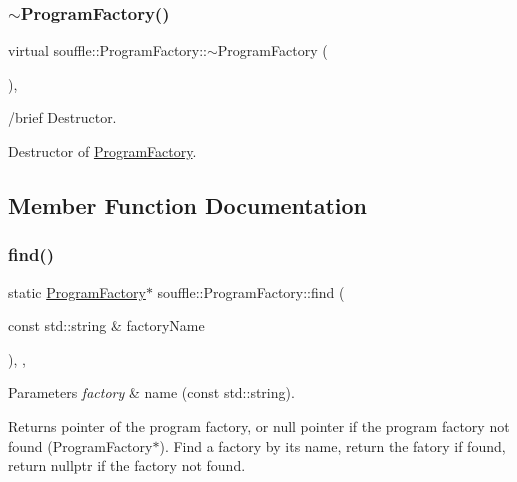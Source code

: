 \subsubsection{\texorpdfstring{$\sim$\+Program\+Factory()}{~ProgramFactory()}}
{\footnotesize\ttfamily virtual souffle\+::\+Program\+Factory\+::$\sim$\+Program\+Factory (\begin{DoxyParamCaption}{ }\end{DoxyParamCaption})\hspace{0.3cm}{\ttfamily [virtual]}, {\ttfamily [default]}}

/brief Destructor.

Destructor of \hyperlink{classsouffle_1_1_program_factory}{Program\+Factory}. 

\subsection{Member Function Documentation}
\mbox{\label{classsouffle_1_1_program_factory_ad2b41c03dbad20406048a9504d89c0c1}} 
\subsubsection{\texorpdfstring{find()}{find()}}
{\footnotesize\ttfamily static \hyperlink{classsouffle_1_1_program_factory}{Program\+Factory}$\ast$ souffle\+::\+Program\+Factory\+::find (\begin{DoxyParamCaption}\item[{const std\+::string \&}]{factory\+Name }\end{DoxyParamCaption})\hspace{0.3cm}{\ttfamily [inline]}, {\ttfamily [static]}, {\ttfamily [protected]}}


\begin{DoxyParams}{Parameters}
{\em factory} & name (const std\+::string). \\
\hline
\end{DoxyParams}
\begin{DoxyReturn}{Returns}
pointer of the program factory, or null pointer if the program factory not found (Program\+Factory$\ast$). Find a factory by its name, return the fatory if found, return nullptr if the factory not found. 
\end{DoxyReturn}
\mbox{\label{classsouffle_1_1_program_factory_aeeb8c8fa86018f5f19cf6d419acdec54}} 
